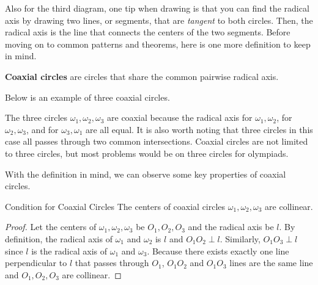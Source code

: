 \documentclass[../../main.tex]{subfiles}
\begin{document}
Also for the third diagram, one tip when drawing is that you can
find the radical axis by drawing two lines, or segments, that are
\textit{tangent} to both circles. Then, the radical axis is the
line that connects the centers of the two segments. Before moving
on to common patterns and theorems, here is one more definition
to keep in mind.

\begin{definition}{}{}
\textbf{Coaxial circles} are circles that share the common pairwise
radical axis.
\end{definition}

Below is an example of three coaxial circles.

\begin{figure}[H]
\centering
{}
\end{figure}

The three circles $\omega_1, \omega_2, \omega_3$ are coaxial because
the radical axis for $\omega_1, \omega_2$, for $\omega_2, \omega_3$,
and for $\omega_3, \omega_1$ are all equal. It is also worth noting
that three circles in this case all passes through two common
intersections. Coaxial circles are not limited to three circles,
but most problems would be on three circles for olympiads.

With the definition in mind, we can observe some key properties
of coaxial circles.

\begin{theorem}{}{Condition for Coaxial Circles}
The centers of coaxial circles $\omega_1, \omega_2, \omega_3$ are
collinear.
\end{theorem}
\begin{proof}
Let the centers of $\omega_1, \omega_2, \omega_3$ be $O_1, O_2, O_3$
and the radical axis be $l$. By definition, the radical axis of
$\omega_1$ and $\omega_2$ is $l$ and $O_1O_2 \perp l$. Similarly,
$O_1O_3 \perp l$ since $l$ is the radical axis of $\omega_1$ and
$\omega_3$. Because there exists exactly one line perpendicular to
$l$ that passes through $O_1$, $O_1O_2$ and $O_1O_3$ lines are the
same line and $O_1,O_2,O_3$ are collinear.
\end{proof}
\end{document}

